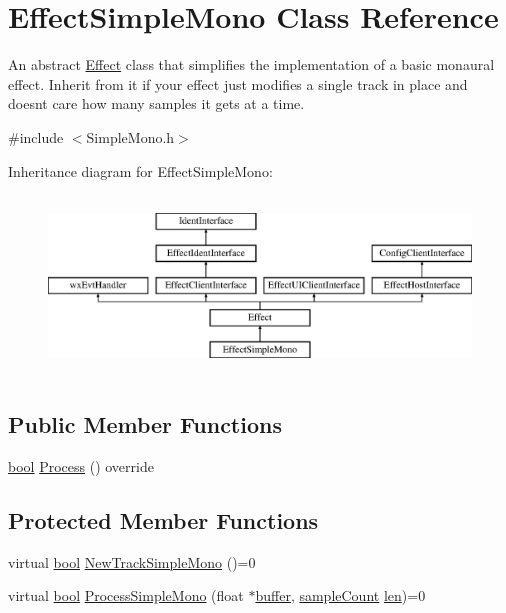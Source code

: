 \hypertarget{class_effect_simple_mono}{}\section{Effect\+Simple\+Mono Class Reference}
\label{class_effect_simple_mono}


An abstract \hyperlink{class_effect}{Effect} class that simplifies the implementation of a basic monaural effect. Inherit from it if your effect just modifies a single track in place and doesn\textquotesingle{}t care how many samples it gets at a time.  




{\ttfamily \#include $<$Simple\+Mono.\+h$>$}

Inheritance diagram for Effect\+Simple\+Mono\+:\begin{figure}[H]
\begin{center}
\leavevmode
\includegraphics[height=4.794520cm]{class_effect_simple_mono}
\end{center}
\end{figure}
\subsection*{Public Member Functions}
\begin{DoxyCompactItemize}
\item 
\hyperlink{mac_2config_2i386_2lib-src_2libsoxr_2soxr-config_8h_abb452686968e48b67397da5f97445f5b}{bool} \hyperlink{class_effect_simple_mono_a6eb96b91847f44738f632b52af2e5518}{Process} () override
\end{DoxyCompactItemize}
\subsection*{Protected Member Functions}
\begin{DoxyCompactItemize}
\item 
virtual \hyperlink{mac_2config_2i386_2lib-src_2libsoxr_2soxr-config_8h_abb452686968e48b67397da5f97445f5b}{bool} \hyperlink{class_effect_simple_mono_a3d7a2fab684784cb5d74973a55d611ab}{New\+Track\+Simple\+Mono} ()=0
\item 
virtual \hyperlink{mac_2config_2i386_2lib-src_2libsoxr_2soxr-config_8h_abb452686968e48b67397da5f97445f5b}{bool} \hyperlink{class_effect_simple_mono_ad7d019cf756bd33a749bc8079764a293}{Process\+Simple\+Mono} (float $\ast$\hyperlink{structbuffer}{buffer}, \hyperlink{include_2audacity_2_types_8h_afa427e1f521ea5ec12d054e8bd4d0f71}{sample\+Count} \hyperlink{lib_2expat_8h_af86d325fecfc8f47b61fbf5a5146f582}{len})=0
\end{DoxyCompactItemize}
